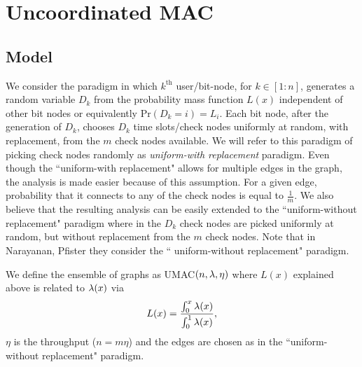 \section{Uncoordinated MAC}
\subsection{Model}
We consider the paradigm in which $k^{\text{th}}$ user/bit-node, for $k\in [1:n]$, generates a random variable $D_{k}$ from the probability mass function $L(x)$ independent of other bit nodes or equivalently $\text{Pr}(D_{k}=i)=L_{i}$. Each bit node, after the generation of $D_{k}$, chooses $D_{k}$ time slots/check nodes uniformly at random, with replacement, from the $m$ check nodes available. We will refer to this paradigm of picking check nodes randomly as \textit{uniform-with replacement} paradigm. Even though the ``uniform-with replacement" allows for multiple edges in the graph, the analysis is made easier because of this assumption. For a given edge, probability that it connects to any of the check nodes is equal to $\frac{1}{m}$. We also believe that the resulting analysis can be easily extended to the ``uniform-without replacement" paradigm where in the $D_{k}$ check nodes are picked uniformly at random, but without replacement from the $m$ check nodes. Note that in Narayanan, Pfister \cite{narayanan2012iterative} they consider the `` uniform-without replacement" paradigm.

We define the ensemble of graphs as UMAC$(n,\lambda,\eta)$ where $L(x)$ explained above is related to $\lambda(x)$ via
\begin{align*}
L(x)=\frac{\int_{0}^{x}\lambda(x)}{\int_{0}^{1}\lambda(x)},
\end{align*}
 $\eta$ is the throughput ($n=m\eta$) and the edges are chosen as in the ``uniform-without replacement" paradigm.

